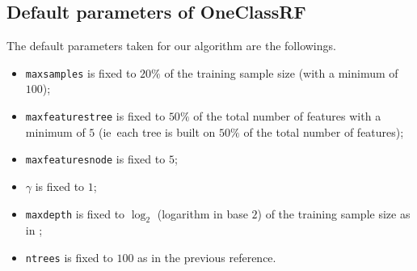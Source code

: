 \subsection{Default parameters of OneClassRF}
The default parameters taken for our algorithm are the followings.
%
\begin{itemize}
    \item \texttt{max\textunderscore samples} is fixed to $20\%$ of the
    training sample size (with a minimum of $100$);
    \item \texttt{max\textunderscore features\textunderscore tree} is fixed to
    $50\%$ of the total number of features with a minimum of $5$ (\acs{ie}~each
    tree is built on $50\%$ of the total number of features);
    \item \texttt{max\textunderscore features\textunderscore node} is fixed to
    $5$;
    \item $\gamma$ is fixed to $1$;
    \item \texttt{max\textunderscore depth} is fixed to $\log_2$ (logarithm in
    base $2$) of the training sample size as in \citet{Liu2008};
    \item \texttt{n\textunderscore trees} is fixed to $100$ as in the previous
    reference.
\end{itemize}
